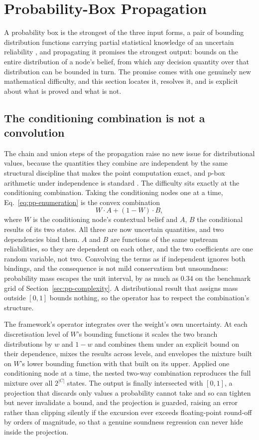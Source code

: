 \documentclass[12pt]{report}
\begin{document}
\section{Probability-Box Propagation}
\label{sec:pp-pbox}

A probability box is the strongest of the three input forms, a pair of bounding distribution functions carrying partial statistical knowledge of an uncertain reliability \cite{ferson2003constructing}, and propagating it promises the strongest output: bounds on the entire distribution of a node's belief, from which any decision quantity over that distribution can be bounded in turn. The promise comes with one genuinely new mathematical difficulty, and this section locates it, resolves it, and is explicit about what is proved and what is not.

\subsection{The conditioning combination is not a convolution}
\label{sec:pp-pbox-operator}

The chain and union steps of the propagation raise no new issue for distributional values, because the quantities they combine are independent by the same structural discipline that makes the point computation exact, and p-box arithmetic under independence is standard \cite{williamson1990probabilistic}. The difficulty sits exactly at the conditioning combination. Taking the conditioning nodes one at a time, Eq.~\eqref{eq:pp-enumeration} is the convex combination
\[
W \cdot A + (1 - W) \cdot B ,
\]
where $W$ is the conditioning node's contextual belief and $A$, $B$ the conditional results of its two states. All three are now uncertain quantities, and two dependencies bind them. $A$ and $B$ are functions of the same upstream reliabilities, so they are dependent on each other, and the two coefficients are one random variable, not two. Convolving the terms as if independent ignores both bindings, and the consequence is not mild conservatism but unsoundness: probability mass escapes the unit interval, by as much as $0.34$ on the benchmark grid of Section~\ref{sec:pp-complexity}. A distributional result that assigns mass outside $[0,1]$ bounds nothing, so the operator has to respect the combination's structure.

The framework's operator integrates over the weight's own uncertainty. At each discretisation level of $W$'s bounding functions it scales the two branch distributions by $w$ and $1 - w$ and combines them under an explicit bound on their dependence, mixes the results across levels, and envelopes the mixture built on $W$'s lower bounding function with that built on its upper. Applied one conditioning node at a time, the nested two-way combination reproduces the full mixture over all $2^{|C|}$ states. The output is finally intersected with $[0, 1]$, a projection that discards only values a probability cannot take and so can tighten but never invalidate a bound, and the projection is guarded, raising an error rather than clipping silently if the excursion ever exceeds floating-point round-off by orders of magnitude, so that a genuine soundness regression can never hide inside the projection.
\end{document}
